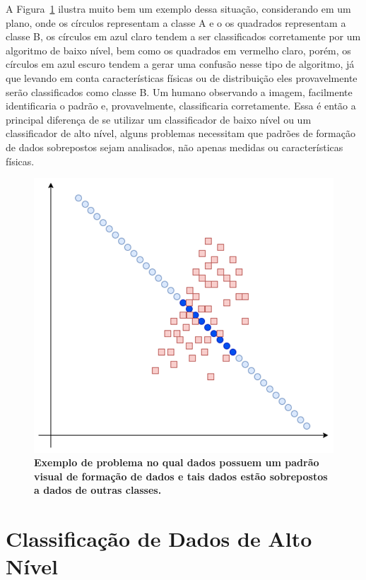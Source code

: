 \documentclass[
12pt,        %
oneside,     %
a4paper,     %
english,       %
brazil        %
%
%
]{ppgca}
\begin{document}
A Figura~\ref{fig:padraovisual} ilustra muito bem um exemplo dessa situação, considerando em um plano, onde os círculos representam a classe A e o os quadrados representam a classe B, os círculos em azul claro tendem a ser classificados corretamente por um algoritmo de baixo nível, bem como os quadrados em vermelho claro, porém, os círculos em azul escuro tendem a gerar uma confusão nesse tipo de algoritmo, já que levando em conta características físicas ou de distribuição eles provavelmente serão classificados como classe B. Um humano observando a imagem, facilmente identificaria o padrão e, provavelmente, classificaria corretamente. Essa é então a principal diferença de se utilizar um classificador de baixo nível ou um classificador de alto nível, alguns problemas necessitam que padrões de formação de dados sobrepostos sejam analisados, não apenas medidas ou características físicas.

\begin{figure}[H]
    \includegraphics[width=\textwidth]{padraovisual.png}
    \centering
    \caption{\textbf{Exemplo de problema no qual dados possuem um padrão visual de formação de dados e tais dados estão sobrepostos a dados de outras classes.}}
    \label{fig:padraovisual}
\end{figure}

\section{Classificação de Dados de Alto Nível}
\end{document}
